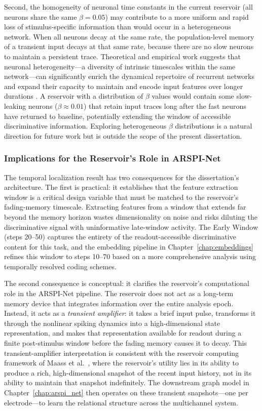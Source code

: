 Second, the homogeneity of neuronal time constants in the current reservoir (all neurons share the same $\beta = 0.05$) may contribute to a more uniform and rapid loss of stimulus-specific information than would occur in a heterogeneous network. When all neurons decay at the same rate, the population-level memory of a transient input decays at that same rate, because there are no slow neurons to maintain a persistent trace. Theoretical and empirical work suggests that neuronal heterogeneity---a diversity of intrinsic timescales within the same network---can significantly enrich the dynamical repertoire of recurrent networks and expand their capacity to maintain and encode input features over longer durations \cite{Kim2024NeuralHeterogeneity}. A reservoir with a distribution of $\beta$ values would contain some slow-leaking neurons ($\beta \approx 0.01$) that retain input traces long after the fast neurons have returned to baseline, potentially extending the window of accessible discriminative information. Exploring heterogeneous $\beta$ distributions is a natural direction for future work but is outside the scope of the present dissertation.

\subsubsection{Implications for the Reservoir's Role in ARSPI-Net}

The temporal localization result has two consequences for the dissertation's architecture. The first is practical: it establishes that the feature extraction window is a critical design variable that must be matched to the reservoir's fading-memory timescale. Extracting features from a window that extends far beyond the memory horizon wastes dimensionality on noise and risks diluting the discriminative signal with uninformative late-window activity. The Early Window (steps 20--50) captures the entirety of the readout-accessible discriminative content for this task, and the embedding pipeline in Chapter~\ref{chap:embeddings} refines this window to steps 10--70 based on a more comprehensive analysis using temporally resolved coding schemes.

The second consequence is conceptual: it clarifies the reservoir's computational role in the ARSPI-Net pipeline. The reservoir does not act as a long-term memory device that integrates information over the entire analysis epoch. Instead, it acts as a \emph{transient amplifier}: it takes a brief input pulse, transforms it through the nonlinear spiking dynamics into a high-dimensional state representation, and makes that representation available for readout during a finite post-stimulus window before the fading memory causes it to decay. This transient-amplifier interpretation is consistent with the reservoir computing framework of Maass et al.\ \cite{Maass2002RealTime}, where the reservoir's utility lies in its ability to produce a rich, high-dimensional snapshot of the recent input history, not in its ability to maintain that snapshot indefinitely. The downstream graph model in Chapter~\ref{chap:arspi_net} then operates on these transient snapshots---one per electrode---to learn the relational structure across the multichannel system.


